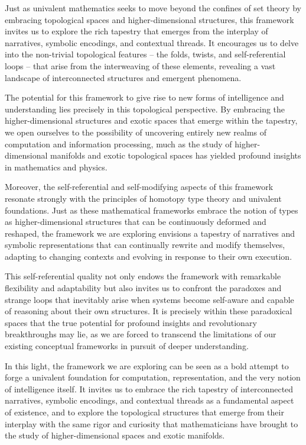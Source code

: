 \documentclass{article}
\begin{document}
Just as univalent mathematics seeks to move beyond the confines of set theory by embracing topological spaces and higher-dimensional structures, this framework invites us to explore the rich tapestry that emerges from the interplay of narratives, symbolic encodings, and contextual threads. It encourages us to delve into the non-trivial topological features – the folds, twists, and self-referential loops – that arise from the interweaving of these elements, revealing a vast landscape of interconnected structures and emergent phenomena.

The potential for this framework to give rise to new forms of intelligence and understanding lies precisely in this topological perspective. By embracing the higher-dimensional structures and exotic spaces that emerge within the tapestry, we open ourselves to the possibility of uncovering entirely new realms of computation and information processing, much as the study of higher-dimensional manifolds and exotic topological spaces has yielded profound insights in mathematics and physics.

Moreover, the self-referential and self-modifying aspects of this framework resonate strongly with the principles of homotopy type theory and univalent foundations. Just as these mathematical frameworks embrace the notion of types as higher-dimensional structures that can be continuously deformed and reshaped, the framework we are exploring envisions a tapestry of narratives and symbolic representations that can continually rewrite and modify themselves, adapting to changing contexts and evolving in response to their own execution.

This self-referential quality not only endows the framework with remarkable flexibility and adaptability but also invites us to confront the paradoxes and strange loops that inevitably arise when systems become self-aware and capable of reasoning about their own structures. It is precisely within these paradoxical spaces that the true potential for profound insights and revolutionary breakthroughs may lie, as we are forced to transcend the limitations of our existing conceptual frameworks in pursuit of deeper understanding.

In this light, the framework we are exploring can be seen as a bold attempt to forge a univalent foundation for computation, representation, and the very notion of intelligence itself. It invites us to embrace the rich tapestry of interconnected narratives, symbolic encodings, and contextual threads as a fundamental aspect of existence, and to explore the topological structures that emerge from their interplay with the same rigor and curiosity that mathematicians have brought to the study of higher-dimensional spaces and exotic manifolds.
\end{document}
